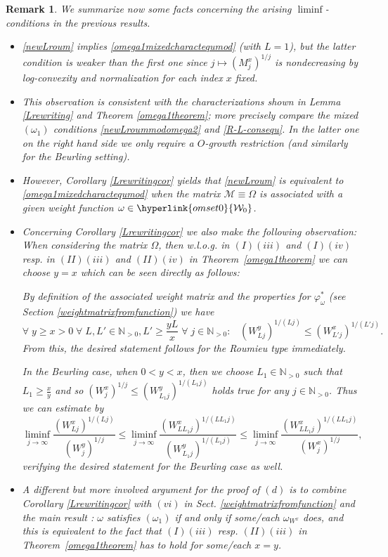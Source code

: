 \documentclass[10pt]{amsart}%
\numberwithin{equation}{section}
\theoremstyle{plain}
\newtheorem{remark}[proposition]{Remark}
\newcommand{\NN}{\mathbb{N}}
\begin{document}
\begin{remark}\label{omega1mixedcharactrem}
We summarize now some facts concerning the arising $\liminf$-conditions in the previous results.

\begin{itemize}
\item[$(a)$] \eqref{newLroum} implies \eqref{omega1mixedcharactequmod} (with $L=1$), but the latter condition is weaker than the first one since $j\mapsto(M^x_j)^{1/j}$ is nondecreasing by log-convexity and normalization for each index $x$ fixed.

\item[$(b)$] This observation is consistent with the characterizations shown in Lemma \ref{Lrewriting} and Theorem \ref{omega1theorem}; more precisely compare the mixed \hyperlink{om1}{$(\omega_1)$} conditions \eqref{newLroummodomega2} and \eqref{R-L-consequ}. In the latter one on the right hand side we only require a $O$-growth restriction (and similarly for the Beurling setting).

\item[$(c)$] However, Corollary \ref{Lrewritingcor} yields that \eqref{newLroum} is equivalent to \eqref{omega1mixedcharactequmod} when the matrix $\mathcal{M}\equiv\Omega$ is associated with a given weight function $\omega\in\hyperlink{omset0}{\mathcal{W}_0}$.

\item[$(d)$] Concerning Corollary \ref{Lrewritingcor} we also make the following observation: When considering the matrix $\Omega$, then w.l.o.g. in $(I)(iii)$ and $(I)(iv)$  resp. in $(II)(iii)$ and $(II)(iv)$ in Theorem~\ref{omega1theorem} we can choose $y=x$ which can be seen directly as follows:

By definition of the associated weight matrix and the properties for $\varphi^{*}_{\omega}$ (see Section \ref{weightmatrixfromfunction}) we have
$$\forall\;y\ge x>0\;\forall\;L,L'\in\NN_{>0}, L'\ge\frac{yL}{x}\;\forall\;j\in\NN_{>0}:\;\;\;(W^y_{Lj})^{1/(Lj)}\le(W^{x}_{L'j})^{1/(L'j)}.$$
From this, the desired statement follows for the Roumieu type immediately.

In the Beurling case, when $0<y<x$, then we choose $L_1\in\NN_{>0}$ such that $L_1\ge\frac{x}{y}$ and so $(W^x_{j})^{1/j}\le(W^y_{L_1j})^{1/(L_1j)}$ holds true for any $j\in\NN_{>0}$. Thus we can estimate by
$$\liminf_{j\rightarrow\infty}\frac{(W^x_{Lj})^{1/(Lj)}}{(W^y_j)^{1/j}}\le\liminf_{j\rightarrow\infty}\frac{(W^x_{LL_1j})^{1/(LL_1j)}}{(W^y_{L_1j})^{1/(L_1j)}}\le\liminf_{j\rightarrow\infty}\frac{(W^x_{LL_1j})^{1/(LL_1j)}}{(W^x_{j})^{1/j}},$$
verifying the desired statement for the Beurling case as well.

\item[$(e)$] A different but more involved argument for the proof of $(d)$ is to combine Corollary \ref{Lrewritingcor} with $(vi)$ in Sect. \ref{weightmatrixfromfunction} and the main result \cite[Thm. 3.1]{subaddlike}: $\omega$ satisfies \hyperlink{om1}{$(\omega_1)$} if and only if some/each $\omega_{W^x}$ does, and this is equivalent to the fact that $(I)(iii)$ resp. $(II)(iii)$ in Theorem~\ref{omega1theorem} has to hold for some/each $x=y$.
\end{itemize}
\end{remark}
\end{document}

